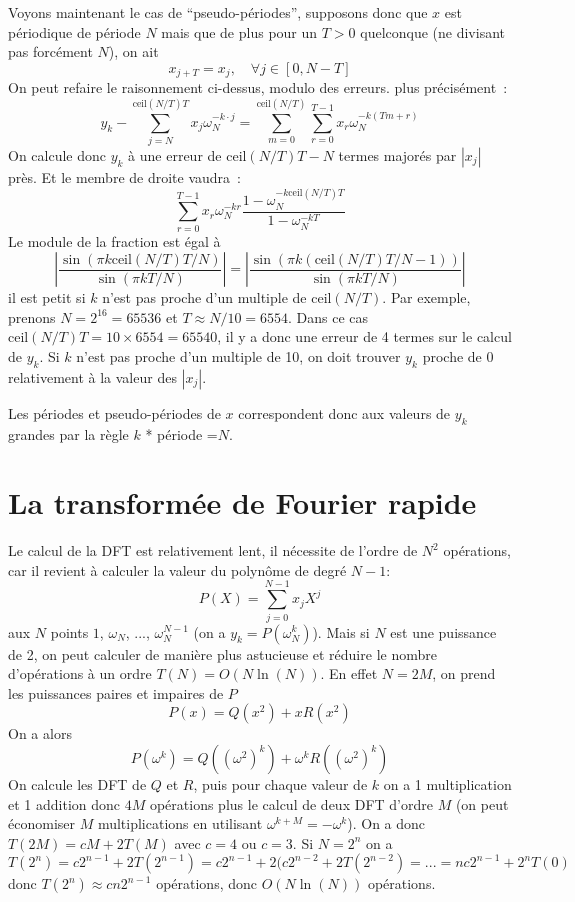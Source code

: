 \documentclass[a4paper,11pt]{book}
\begin{document}
\begin{giacjshere}
Voyons maintenant le cas de ``pseudo-périodes'', supposons donc
que $x$ est périodique de période $N$ mais que de plus pour un $T>0$ 
quelconque (ne divisant pas forcément $N$), on ait
\[ x_{j+T}=x_j, \quad \forall j \in[0,N-T] \]
On peut refaire le raisonnement ci-dessus, modulo des erreurs.
plus précisément~:
\[ y_k - \sum_{j=N}^{\mbox{ceil}(N/T)T}x_j \omega_N^{-k\cdot j} 
= \sum_{m=0}^{\mbox{ceil}(N/T)} \sum_{r=0}^{T-1} x_r \omega_N^{-k (T m+r)} \]
On calcule donc $y_k$ à une erreur de $\mbox{ceil}(N/T)T-N$ termes majorés
par $|x_j|$ près.
Et le membre de droite vaudra~:
\[ \sum_{r=0}^{T-1} x_r \omega_N^{-kr} 
\frac{1-\omega_N^{-k\mbox{ceil}(N/T) T}}{1-\omega_N^{-kT}}
\]
Le module de la fraction est égal à
\[ |\frac{\sin(\pi k \mbox{ceil}(N/T) T/N)}{\sin(\pi k T/N)} |
= |\frac{\sin(\pi k (\mbox{ceil}(N/T) T/N-1))}{\sin(\pi k T/N)} |
\]
il est petit si $k$ n'est pas proche d'un multiple de $\mbox{ceil}(N/T)$.
Par exemple, prenons $N=2^16=65536$ et $T \approx N/10 =6554$. Dans
ce cas $\mbox{ceil}(N/T)T=10 \times 6554=65540$, il y a donc une erreur
de 4 termes sur le calcul de $y_k$. Si $k$ n'est pas proche d'un multiple
de 10, on doit trouver $y_k$ proche de 0 relativement à la valeur des $|x_j|$.

Les périodes et pseudo-périodes de $x$ correspondent donc aux
valeurs de $y_k$ grandes par la règle $k$ * période =$N$.

\section{La transformée de Fourier rapide}
Le calcul de la DFT est relativement lent, il nécessite de l'ordre
de $N^2$ opérations, car il revient à calculer la valeur du polynôme
de degré $N-1$:
\[ P(X)=\sum_{j=0}^{N-1} x_j X^j \]
aux $N$ points $1$, $\omega_N$, ..., $\omega_N^{N-1}$ 
(on a $y_k=P(\omega_N^k)$).
Mais si $N$ est une puissance de 2, on peut calculer de manière plus
astucieuse et réduire le nombre d'opérations à un ordre $T(N)=O(N \ln(N))$.
En effet $N=2M$,
on prend les
puissances paires et impaires de $P$
$$ P(x)=Q(x^2)+xR(x^2)$$
On a alors
$$ P(\omega^k)=Q( (\omega^2)^k)+\omega^k R((\omega^2)^k)$$
On calcule les DFT de $Q$ et $R$, puis pour chaque valeur de $k$ on a
1 multiplication et 1 addition donc $4M$ op\'erations plus le calcul
de deux DFT d'ordre $M$ (on peut \'economiser $M$ multiplications
en utilisant $\omega^{k+M} =-\omega^k$). On a donc $T(2M)=cM+2T(M)$
avec $c=4$ ou $c=3$. Si $N=2^n$ on a 
$$T(2^n)=c2^{n-1}+2T(2^{n-1})
= c2^{n-1}+2(c2^{n-2}+2T(2^{n-2})
=...=nc2^{n-1}+2^nT(0)$$
donc $T(2^n) \approx cn2^{n-1}$ op\'erations, donc $O(N\ln(N))$
opérations.


\end{giacjshere}
\end{document}
